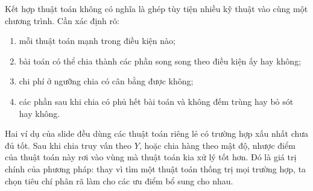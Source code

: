 \documentclass[11pt]{article}
\begin{document}
Kết hợp thuật toán không có nghĩa là ghép tùy tiện nhiều kỹ thuật vào cùng
một chương trình. Cần xác định rõ:
\begin{enumerate}
  \item mỗi thuật toán mạnh trong điều kiện nào;
  \item bài toán có thể chia thành các phần song song theo điều kiện ấy hay
  không;
  \item chi phí ở ngưỡng chia có cân bằng được không;
  \item các phần sau khi chia có phủ hết bài toán và không đếm trùng hay bỏ
  sót hay không.
\end{enumerate}

Hai ví dụ của slide đều dùng các thuật toán riêng lẻ có trường hợp xấu nhất
chưa đủ tốt. Sau khi chia truy vấn theo \(Y\), hoặc chia hàng theo mật độ,
nhược điểm của thuật toán này rơi vào vùng mà thuật toán kia xử lý tốt hơn.
Đó là giá trị chính của phương pháp: thay vì tìm một thuật toán thống trị mọi
trường hợp, ta chọn tiêu chí phân rã làm cho các ưu điểm bổ sung cho nhau.
\end{document}
